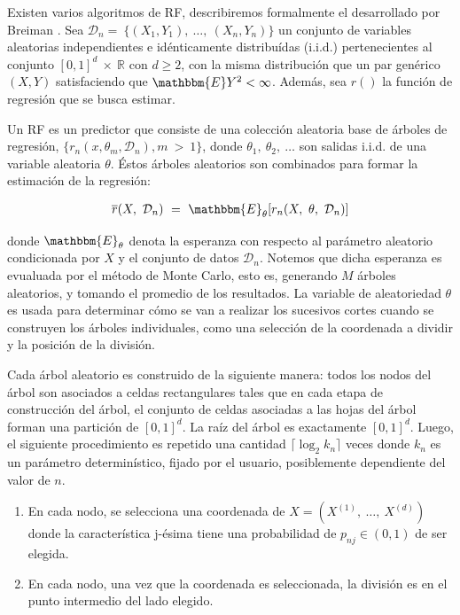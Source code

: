  \par Existen varios algoritmos de RF, describiremos formalmente el desarrollado
    por Breiman \cite{random_forest}.
    Sea $\mathcal{D}_{n} = \ \{ (X_{1}, Y_{1}), \ \dots, \ (X_{n}, Y_{n})\}$
    un conjunto de variables aleatorias independientes e idénticamente distribuídas (i.i.d.)
    pertenecientes al conjunto $[0,1]^{d} \ \times \ \mathbb{R} $ con $d \geq 2$,
    con la misma distribución que un par genérico $(X,Y)$ satisfaciendo que
    $\mathbbm{E}Y^{2} < \infty$. Además, sea $r()$ la función de regresión que se busca estimar.

  \par Un RF es un predictor que consiste de una colección aleatoria base
    de árboles de regresión, $\{ r_{n}(x, \theta_{m}, \mathcal{D}_{n}), m \ > \ 1 \}$, donde
    $\theta_{1},\ \theta_{2},\ \dots$ son salidas i.i.d. de una variable aleatoria
    $\theta$. Éstos árboles aleatorios son combinados para formar la estimación
    de la regresión:

    \begin{align}
      \overline{r}(X,\ \mathcal{D}_{n})\ =\ \mathbbm{E}_{\theta}[r_{n}(X,\ \theta,\ \mathcal{D}_{n})]
    \end{align}

    donde $\mathbbm{E}_{\theta}$ denota la esperanza con respecto al parámetro aleatorio
    condicionada por $X$ y el conjunto de datos $\mathcal{D}_{n}$. Notemos que
    dicha esperanza es evualuada por el método de Monte Carlo\cite{monte_carlo},
    esto es, generando $M$ árboles aleatorios, y tomando el promedio de los resultados.
    La variable de aleatoriedad $\theta$ es usada para determinar cómo se van a realizar los
    sucesivos cortes cuando se construyen los árboles individuales, como una selección
    de la coordenada a dividir y la posición de la división.

  \par Cada árbol aleatorio es construido de la siguiente manera: todos los nodos
    del árbol son asociados a celdas rectangulares tales que en cada etapa de
    construcción del árbol, el conjunto de celdas asociadas a las hojas del árbol
    forman una partición de $[0, 1]^{d}$. La raíz del árbol es exactamente $[0, 1]^{d}$.
    Luego, el siguiente procedimiento es repetido una cantidad $\lceil \log_{2}k_{n} \rceil$ veces
    donde $k_{n}$ es un parámetro determinístico, fijado por el usuario, posiblemente
    dependiente del valor de $n$.

    \begin{enumerate}
      \item En cada nodo, se selecciona una coordenada de $X = (X^{(1)}, \ \dots,\ X^{(d)})$
            donde la característica j-ésima tiene una probabilidad de $p_{nj} \in (0,1)$
            de ser elegida.
      \item En cada nodo, una vez que la coordenada es seleccionada, la división es
            en el punto intermedio del lado elegido.
    \end{enumerate}


